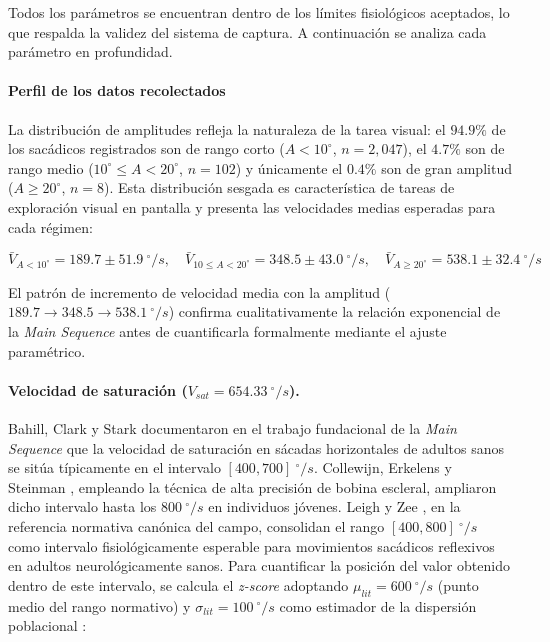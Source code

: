 Todos los parámetros se encuentran dentro de los límites fisiológicos aceptados, lo que respalda la validez del sistema de captura.
A continuación se analiza cada parámetro en profundidad.

\paragraph{Perfil de los datos recolectados}
La distribución de amplitudes refleja la naturaleza de la tarea visual: el $94.9\%$ de los sacádicos registrados son de rango corto ($A < 10^\circ$, $n = 2{,}047$), el $4.7\%$ son de rango medio ($10^\circ \leq A < 20^\circ$, $n = 102$) y únicamente el $0.4\%$ son de gran amplitud ($A \geq 20^\circ$, $n = 8$).
Esta distribución sesgada es característica de tareas de exploración visual en pantalla \cite{holmqvist2011eye} y presenta las velocidades medias esperadas para cada régimen:

\begin{equation}
	\bar{V}_{A<10^\circ} = 189.7 \pm 51.9~^\circ/s, \quad
	\bar{V}_{10 \leq A < 20^\circ} = 348.5 \pm 43.0~^\circ/s, \quad
	\bar{V}_{A \geq 20^\circ} = 538.1 \pm 32.4~^\circ/s
	\label{eq:vel_por_grupo}
\end{equation}

El patrón de incremento de velocidad media con la amplitud ($189.7 \rightarrow 348.5 \rightarrow 538.1~^\circ/s$) confirma cualitativamente la relación exponencial de la \textit{Main Sequence} antes de cuantificarla formalmente mediante el ajuste paramétrico.
\paragraph{Velocidad de saturación ($V_{sat} = 654.33~^\circ/s$).}

Bahill, Clark y Stark \cite{bahill1975} documentaron en el trabajo fundacional de la \textit{Main Sequence} que la velocidad de saturación en sácadas horizontales de adultos sanos se sitúa típicamente en el intervalo $[400, 700]~^\circ/s$.
Collewijn, Erkelens y Steinman \cite{collewijn1988binocular}, empleando la técnica de alta precisión de bobina escleral, ampliaron dicho intervalo hasta los $800~^\circ/s$ en individuos jóvenes.
Leigh y Zee \cite{leigh2015neurology}, en la referencia normativa canónica del campo, consolidan el rango $[400, 800]~^\circ/s$ como intervalo fisiológicamente esperable para movimientos sacádicos reflexivos en adultos neurológicamente sanos.
Para cuantificar la posición del valor obtenido dentro de este intervalo, se calcula el \textit{z-score} adoptando $\mu_{lit} = 600~^\circ/s$ (punto medio del rango normativo) y $\sigma_{lit} = 100~^\circ/s$ como estimador de la dispersión poblacional \cite{boghen1974velocity}:

